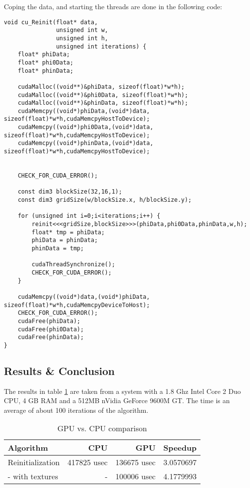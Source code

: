 Coping the data, and starting the threads are done in the following code:

\begin{lstlisting}
void cu_Reinit(float* data, 
               unsigned int w,
               unsigned int h,
               unsigned int iterations) {
    float* phiData;
    float* phi0Data;
    float* phinData;

    cudaMalloc((void**)&phiData, sizeof(float)*w*h);
    cudaMalloc((void**)&phi0Data, sizeof(float)*w*h);
    cudaMalloc((void**)&phinData, sizeof(float)*w*h);
    cudaMemcpy((void*)phiData,(void*)data, sizeof(float)*w*h,cudaMemcpyHostToDevice);
    cudaMemcpy((void*)phi0Data,(void*)data, sizeof(float)*w*h,cudaMemcpyHostToDevice);
    cudaMemcpy((void*)phinData,(void*)data, sizeof(float)*w*h,cudaMemcpyHostToDevice);


    CHECK_FOR_CUDA_ERROR();

    const dim3 blockSize(32,16,1);
    const dim3 gridSize(w/blockSize.x, h/blockSize.y);

    for (unsigned int i=0;i<iterations;i++) {
        reinit<<<gridSize,blockSize>>>(phiData,phi0Data,phinData,w,h);
        float* tmp = phiData;
        phiData = phinData;
        phinData = tmp;

        cudaThreadSynchronize();
        CHECK_FOR_CUDA_ERROR();
    }

    cudaMemcpy((void*)data,(void*)phiData, sizeof(float)*w*h,cudaMemcpyDeviceToHost);
    CHECK_FOR_CUDA_ERROR();
    cudaFree(phiData);
    cudaFree(phi0Data);
    cudaFree(phinData);
}

\end{lstlisting}

\subsection{Results \& Conclusion}

The results in table \ref{tbl:cudaRes} are taken from a system with a
1.8 Ghz Intel Core 2 Duo CPU, 4 GB RAM and a 512MB nVidia GeForce
9600M GT. The time is an average of about 100 iterations of the
algorithm.

\begin{table}[h]
  \centering
  \begin{tabular}{|l|r|r|r|}
    \hline    Algorithm & CPU & GPU & Speedup \\
\hline
Reinitialization & 417825 usec & 136675 usec & 3.0570697 \\
- with textures & - & 100006 usec & 4.1779993 \\
\hline
  \end{tabular}
  \caption{GPU vs. CPU comparison}
  \label{tbl:cudaRes}
\end{table}

